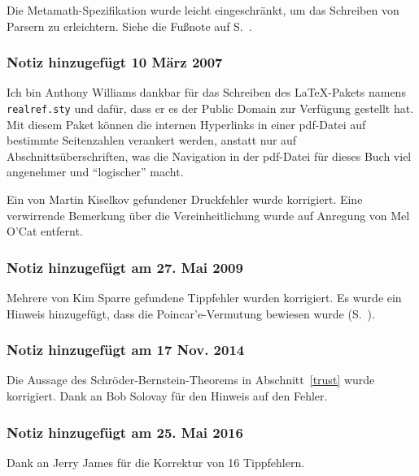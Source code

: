 Die Metamath-Spezifikation wurde leicht eingeschränkt, um das Schreiben von Parsern zu erleichtern.  Siehe die Fußnote auf S.~\pageref{namespace}.


\subsubsection{Notiz hinzugefügt 10 März 2007}\label{note2006b}

Ich bin Anthony Williams dankbar für das Schreiben des \LaTeX-Pakets namens {\tt realref.sty} und dafür, dass er es der Public Domain zur Verfügung gestellt hat.  Mit diesem Paket können die internen Hyperlinks in einer {\sc pdf}-Datei auf bestimmte Seitenzahlen verankert werden, anstatt nur auf Abschnittsüberschriften, was die Navigation in der {\sc pdf}-Datei für dieses Buch viel angenehmer und "`logischer"' macht.

Ein von Martin Kiselkov gefundener Druckfehler wurde korrigiert.
Eine verwirrende Bemerkung über die Vereinheitlichung wurde auf Anregung von Mel O'Cat entfernt.


\subsubsection{Notiz hinzugefügt am 27. Mai 2009}\label{note2009}

Mehrere von Kim Sparre gefundene Tippfehler wurden korrigiert.  Es wurde ein Hinweis hinzugefügt, dass die Poincar'{e}-Vermutung bewiesen wurde (S.~\pageref{poincare}).


\subsubsection{Notiz hinzugefügt am 17 Nov. 2014}\label{note2014}

Die Aussage des Schröder-Bernstein-Theorems in Abschnitt~\ref{trust} wurde korrigiert.  Dank an Bob Solovay für den Hinweis auf den Fehler.


\subsubsection{Notiz hinzugefügt am 25. Mai 2016}\label{note2016}

Dank an Jerry James für die Korrektur von 16 Tippfehlern.


